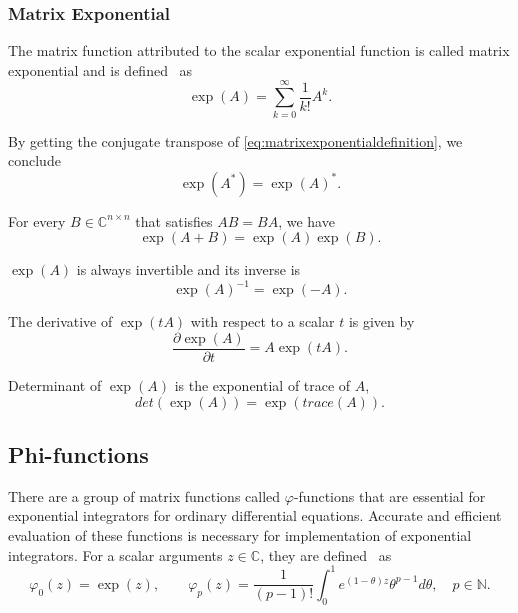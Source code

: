 \subsubsection*{Matrix Exponential}
The matrix function attributed to the scalar exponential function is called matrix exponential and
is defined~\cite{higham2008functions} as
\begin{equation}
    \label{eq:matrixexponentialdefinition}
    \exp(A) = \sum_{k=0}^{\infty}{\frac{1}{k!} A^k}.
\end{equation}

By getting the conjugate transpose of \autoref{eq:matrixexponentialdefinition}, we conclude
\begin{equation}
    \exp(A^{*}) = \exp(A)^{*}.
\end{equation}

For every $B \in \mathbb{C}^{n \times n}$ that satisfies $AB = BA$, we have
\begin{equation}
    \exp(A + B) = \exp(A) \exp(B).
\end{equation}

$\exp(A)$ is always invertible and its inverse is
\begin{equation}
    \exp(A)^{-1} = \exp(-A).
\end{equation}

The derivative of $\exp(tA)$ with respect to a scalar $t$ is given by
\begin{equation}
    \frac{\partial \exp(A)}{\partial t} = A \exp(tA).
\end{equation}

Determinant of $\exp(A)$ is the exponential of trace of $A$,
\begin{equation}
    det(\exp(A)) = \exp(trace(A)).
\end{equation}

\subsection{Phi-functions}
There are a group of matrix functions called $\varphi$-functions that are essential
for exponential integrators for ordinary differential equations. Accurate and efficient
evaluation of these functions is necessary for implementation of exponential integrators.
For a scalar arguments $z \in \mathbb{C}$, they are defined~\cite{higham2008functions} as
\begin{equation}
    \label{eq:scalarphifunctionsdefinition}
    \varphi_0(z) = \exp(z), \qquad
    \varphi_p(z) = \frac{1}{(p-1)!} \int_{0}^{1}{e^{(1 - \theta)z} \theta^{p-1} d\theta},
    \quad p \in \mathbb{N}.
\end{equation}

